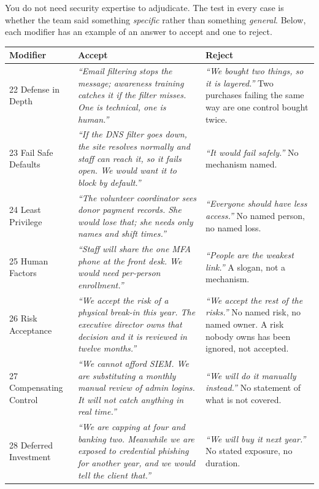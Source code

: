 \documentclass[11pt,letterpaper]{article}
\newcommand{\say}[1]{\textit{``#1''}}
\begin{document}
You do not need security expertise to adjudicate. The test in every case is
whether the team said something \emph{specific} rather than something
\emph{general}. Below, each modifier has an example of an answer to accept and
one to reject.

\begin{center}
\small
\begin{longtable}{@{}p{2.5cm} p{5.15cm} p{5.15cm}@{}}
\toprule
\textbf{Modifier} & \textbf{Accept} & \textbf{Reject} \\
\midrule
\endhead
22 Defense in Depth
& \say{Email filtering stops the message; awareness training catches it if the
filter misses. One is technical, one is human.}
& \say{We bought two things, so it is layered.} Two purchases failing the
same way are one control bought twice. \\
23 Fail Safe Defaults
& \say{If the DNS filter goes down, the site resolves normally and staff can
reach it, so it fails open. We would want it to block by default.}
& \say{It would fail safely.} No mechanism named. \\
24 Least Privilege
& \say{The volunteer coordinator sees donor payment records. She would lose
that; she needs only names and shift times.}
& \say{Everyone should have less access.} No named person, no named loss. \\
25 Human Factors
& \say{Staff will share the one MFA phone at the front desk. We would need
per-person enrollment.}
& \say{People are the weakest link.} A slogan, not a mechanism. \\
26 Risk Acceptance
& \say{We accept the risk of a physical break-in this year. The executive
director owns that decision and it is reviewed in twelve months.}
& \say{We accept the rest of the risks.} No named risk, no named owner. A risk
nobody owns has been ignored, not accepted. \\
27 Compensating Control
& \say{We cannot afford SIEM. We are substituting a monthly manual review of
admin logins. It will not catch anything in real time.}
& \say{We will do it manually instead.} No statement of what is not covered. \\
28 Deferred Investment
& \say{We are capping at four and banking two. Meanwhile we are exposed to
credential phishing for another year, and we would tell the client that.}
& \say{We will buy it next year.} No stated exposure, no duration. \\
\bottomrule
\end{longtable}
\end{center}
\end{document}
